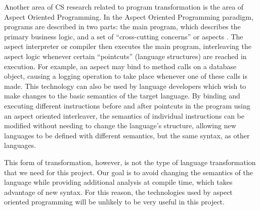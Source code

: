 Another area of CS research related to program transformation is the area of
Aspect Oriented Programming. In the Aspect Oriented Programming paradigm,
programs are described in two parts: the main program, which describes the
primary business logic, and a set of “cross-cutting concerns” or
aspects \cite{aspectpaper}. The aspect interpreter or compiler then executes the
main program, interleaving the aspect logic whenever certain “pointcuts”
(language structures) are reached in execution. For example, an aspect may bind
to method calls on a database object, causing a logging operation to take place
whenever one of these calls is made. This technology can also be used by
language developers which wish to make changes to the basic semantics of the
target language. By binding and executing different instructions before and
after pointcuts in the program using an aspect oriented interleaver, the
semantics of individual instructions can be modified without needing to change
the language’s structure, allowing new languages to be defined with different
semantics, but the same syntax, as other languages.

This form of transformation, however, is not the type of language transformation
that we need for this project. Our goal is to avoid changing the semantics of
the language while providing additional analysis at compile time, which takes
advantage of new syntax. For this reason, the technologies used by aspect
oriented programming will be unlikely to be very useful in this project.

